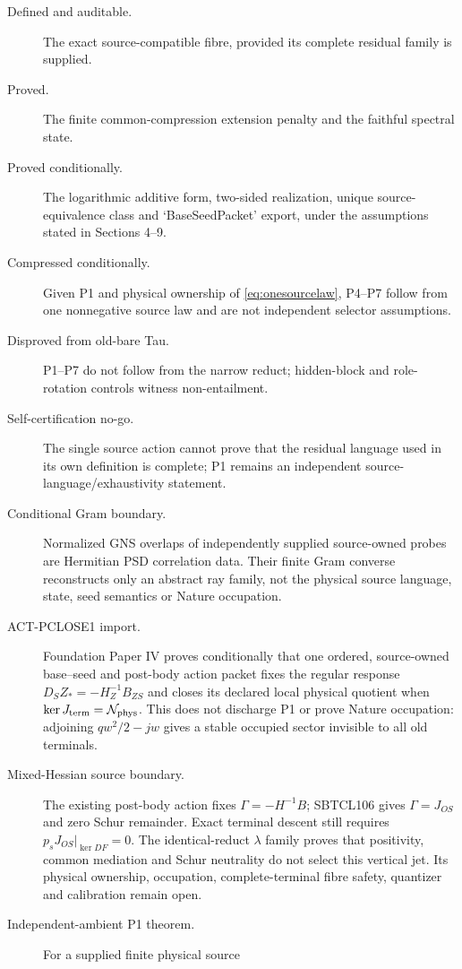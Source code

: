 \documentclass[11pt,a4paper]{article}
\theoremstyle{remark}
\begin{document}
\begin{description}
 \item[Defined and auditable.] The exact source-compatible fibre, provided
 its complete residual family is supplied.
 \item[Proved.] The finite common-compression extension penalty and the
 faithful spectral state.
 \item[Proved conditionally.] The logarithmic additive form, two-sided
 realization, unique source-equivalence class and `BaseSeedPacket' export,
 under the assumptions stated in Sections 4--9.
 \item[Compressed conditionally.] Given P1 and physical ownership of
 \eqref{eq:onesourcelaw}, P4--P7 follow from one nonnegative source law and are
 not independent selector assumptions.
 \item[Disproved from old-bare Tau.] P1--P7 do not follow from the narrow
 reduct; hidden-block and role-rotation controls witness non-entailment.
 \item[Self-certification no-go.] The single source action cannot prove
 that the residual language used in its own definition is complete; P1 remains
 an independent source-language/exhaustivity statement.
 \item[Conditional Gram boundary.] Normalized GNS overlaps of independently
 supplied source-owned probes are Hermitian PSD correlation data.  Their
 finite Gram converse reconstructs only an abstract ray family, not the
 physical source language, state, seed semantics or Nature occupation.
 \item[ACT-PCLOSE1 import.] Foundation Paper IV proves conditionally that one
 ordered, source-owned base--seed and post-body action packet fixes the regular
 response $D_SZ_*=\allowbreak -H_Z^{-1}B_{ZS}$ and closes its declared local
 physical quotient when $\ker J_{\rm term}=\allowbreak\mathcal N_{\rm phys}$.
 This does not discharge P1 or prove Nature occupation: adjoining
 $q w^2/2-jw$ gives a stable occupied sector invisible to all old terminals.
 \item[Mixed-Hessian source boundary.] The existing post-body action fixes
 $\Gamma=-H^{-1}B$; SBTCL106 gives $\Gamma=J_{OS}$ and zero Schur remainder.
 Exact terminal descent still requires
 $p_sJ_{OS}\vert_{\ker DF}=0$.  The identical-reduct $\lambda$ family proves
 that positivity, common mediation and Schur neutrality do not select this
 vertical jet.  Its physical ownership, occupation, complete-terminal fibre
 safety, quantizer and calibration remain open.
 \item[Independent-ambient P1 theorem.] For a supplied finite physical source

\end{description}
\end{document}

